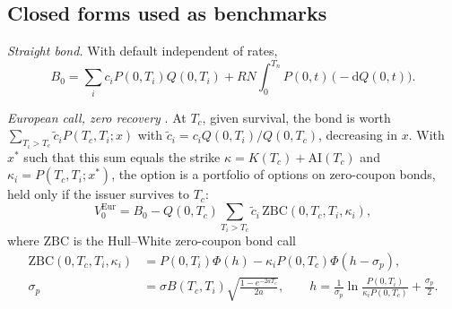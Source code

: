 \documentclass[11pt,a4paper]{article}
\newcommand{\dd}{\mathrm{d}}
\newcommand{\AI}{\mathrm{AI}}
\begin{document}
\subsection{Closed forms used as benchmarks}
\emph{Straight bond.} With default independent of rates,
\begin{equation}
B_0 = \sum_i c_i P(0,T_i)Q(0,T_i) + RN\int_0^{T_n} P(0,t)\,\big(-\dd Q(0,t)\big).
\end{equation}

\emph{European call, zero recovery} \cite{jamshidian1989}. At $T_c$, given survival, the bond is worth
$\sum_{T_i > T_c} \tilde c_i P(T_c, T_i; x)$ with $\tilde c_i = c_i Q(0,T_i)/Q(0,T_c)$, decreasing in $x$. With $x^*$
such that this sum equals the strike $\kappa = K(T_c) + \AI(T_c)$ and $\kappa_i = P(T_c,T_i;x^*)$, the option is a
portfolio of options on zero-coupon bonds, held only if the issuer survives to $T_c$:
\begin{equation}
V^{\mathrm{Eur}}_0 = B_0 - Q(0,T_c)\sum_{T_i > T_c}\tilde c_i\,\mathrm{ZBC}(0, T_c, T_i, \kappa_i),
\end{equation}
where $\mathrm{ZBC}$ is the Hull--White zero-coupon bond call
\begin{equation}
\begin{aligned}
\mathrm{ZBC}(0,T_c,T_i,\kappa_i) &= P(0,T_i)\Phi(h) - \kappa_i P(0,T_c)\Phi(h - \sigma_p),\\
\sigma_p &= \sigma B(T_c,T_i)\sqrt{\tfrac{1-e^{-2aT_c}}{2a}}, \qquad
h = \frac{1}{\sigma_p}\ln\frac{P(0,T_i)}{\kappa_i P(0,T_c)} + \frac{\sigma_p}{2}.
\end{aligned}
\end{equation}
\end{document}

